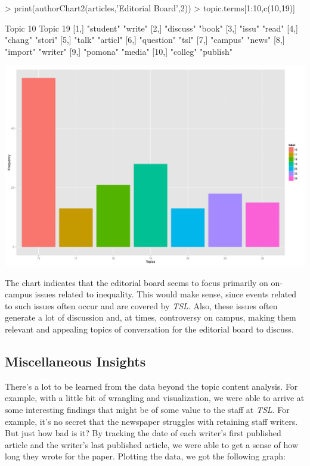 \documentclass[a4paper]{article}
\begin{document}
\begin{Schunk}
\begin{Sinput}
> print(authorChart2(articles,'Editorial Board',2))
> topic.terms[1:10,c(10,19)]
\end{Sinput}
\begin{Soutput}
      Topic 10   Topic 19 
 [1,] "student"  "write"  
 [2,] "discuss"  "book"   
 [3,] "issu"     "read"   
 [4,] "chang"    "stori"  
 [5,] "talk"     "articl" 
 [6,] "question" "tsl"    
 [7,] "campus"   "news"   
 [8,] "import"   "writer" 
 [9,] "pomona"   "media"  
[10,] "colleg"   "publish"
\end{Soutput}
\end{Schunk}
\includegraphics{FinalProject-012}

The chart indicates that the editorial board seems to focus primarily on on-campus issues related to inequality. This would make sense, since events related to such issues often occur and are covered by \textit{TSL}. Also, these issues often generate a lot of discussion and, at times, controversy on campus, making them relevant and appealing topics of conversation for the editorial board to discuss.

\subsection{Miscellaneous Insights}


There's a lot to be learned from the data beyond the topic content analysis. For example, with a little bit of wrangling and visualization, we were able to arrive at some interesting findings that might be of some value to the staff at \textit{TSL}. For example, it's no secret that the newspaper struggles with retaining staff writers. But just how bad is it? By tracking the date of each writer's first published article and the writer's last published article, we were able to get a sense of how long they wrote for the paper. Plotting the data, we got the following graph:
\end{document}
